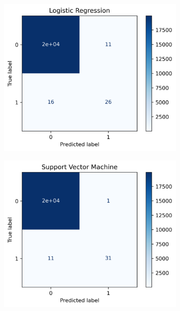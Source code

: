 \documentclass[utf8x]{ctexart}
\begin{document}
\begin{figure}[htb]
  \centering
  \begin{subfigure}[b]{0.32\textwidth}
    \centering
    \includegraphics[width=\textwidth]{./images/reg_conf1.png}
    \label{fig:qqplotreszprice}
  \end{subfigure}
  \begin{subfigure}[b]{0.32\textwidth}
    \centering
    \includegraphics[width=\textwidth]{./images/svm_conf1.png}
    \label{fig:qqplotyyhatprice}

\end{subfigure}
\end{figure}
\end{document}
